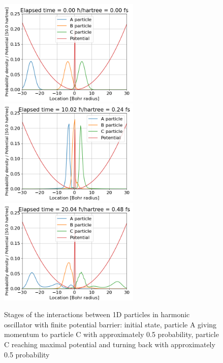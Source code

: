 \begin{figure}
	\begin{center}
		\includegraphics[width=0.6\textwidth]{figures/1d_oscillator_tunneling_01.png}
		\includegraphics[width=0.6\textwidth]{figures/1d_oscillator_tunneling_02.png}
		\includegraphics[width=0.6\textwidth]{figures/1d_oscillator_tunneling_03.png}
		\caption{Stages of the interactions between 1D particles in harmonic oscillator with finite potential barrier: initial state, particle A giving momentum to particle C with approximately 0.5 probability, particle C reaching maximal potential and turning back with approximately 0.5 probability}
		\label{fig:1d_osc_with_tunneling}
	\end{center}	
\end{figure}

